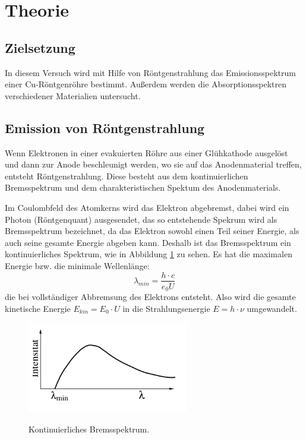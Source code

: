 \section{Theorie}
\label{sec:Theorie}
\subsection{Zielsetzung}
In diesem Versuch wird mit Hilfe von Röntgenstrahlung
das Emissionsspektrum einer
Cu-Röntgenröhre bestimmt. Außerdem werden die Absorptionsspektren verschiedener
Materialien untersucht.

\subsection{Emission von Röntgenstrahlung}
Wenn Elektronen in einer evakuierten Röhre aus einer Glühkathode ausgelöst und
dann zur Anode beschleunigt werden, wo sie auf das Anodenmaterial treffen, entsteht
Röntgenstrahlung. Diese besteht aus dem kontinuierlichen Bremsspektrum und dem
charakteristischen Spektum des Anodenmaterials.

Im Coulombfeld des Atomkerns wird das Elektron abgebremst, dabei wird ein
Photon (Röntgenquant) ausgesendet, das so entstehende Spekrum wird als Bremsspektrum
bezeichnet, da das Elektron sowohl einen Teil seiner Energie, als auch
seine gesamte Energie abgeben kann. Deshalb ist das Bremsspektrum ein kontinuierliches
Spektrum, wie in Abbildung \ref{fig:kont} zu sehen. Es hat die maximalen Energie bzw. die minimale Wellenlänge:
\begin{equation}
  \lambda_{min}=\frac{h\cdot c}{e_0 U}
  \label{eqn:lamdbamin}
\end{equation}
die bei vollständiger Abbremsung des Elektrons entsteht. Also wird die gesamte
kinetische Energie $E_{kin}=E_{0} \cdot U$ in die  Strahlungsenergie $E=h\cdot \nu$
umgewandelt.
\begin{figure}
  \centering
  \includegraphics[height=4cm]{kont.png}
  \caption{Kontinuierliches Bremsspektrum.}
  \label{fig:kont}
  \cite{skript}
\end{figure}

